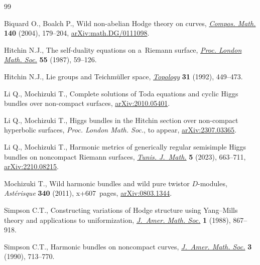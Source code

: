 \begin{thebibliography}{99}
\footnotesize\itemsep=0pt

Biquard O., Boalch P., Wild non-abelian {H}odge theory on curves,
 \href{https://doi.org/10.1112/S0010437X03000010}{\textit{Compos. Math.}} \textbf{140} (2004), 179--204,
 \href{https://arxiv.org/abs/math.DG/0111098}{arXiv:math.DG/0111098}.

Hitchin N.J., The self-duality equations on a~{R}iemann surface, \href{https://doi.org/10.1112/plms/s3-55.1.59}{\textit{Proc.
 London Math. Soc.}} \textbf{55} (1987), 59--126.

Hitchin N.J., Lie groups and {T}eichm\"uller space, \href{https://doi.org/10.1016/0040-9383(92)90044-I}{\textit{Topology}}
 \textbf{31} (1992), 449--473.

Li Q., Mochizuki T., Complete solutions of {T}oda equations and cyclic {H}iggs
 bundles over non-compact surfaces, \href{https://arxiv.org/abs/2010.05401}{arXiv:2010.05401}.

Li Q., Mochizuki T., Higgs bundles in the {H}itchin section over non-compact
 hyperbolic surfaces, \textit{Proc. London Math. Soc.}, {t}o appear,
 \href{https://arxiv.org/abs/2307.03365}{arXiv:2307.03365}.

Li Q., Mochizuki T., Harmonic metrics of generically regular semisimple {H}iggs
 bundles on noncompact {R}iemann surfaces, \href{https://doi.org/10.2140/tunis.2023.5.663}{\textit{Tunis. J.~Math.}} \textbf{5}
 (2023), 663--711, \href{https://arxiv.org/abs/2210.08215}{arXiv:2210.08215}.

Mochizuki T., Wild harmonic bundles and wild pure twistor {$D$}-modules,
 \textit{Ast\'erisque} \textbf{340} (2011), x+607~pages, \href{https://arxiv.org/abs/0803.1344}{arXiv:0803.1344}.

Simpson C.T., Constructing variations of {H}odge structure using
 {Y}ang--{M}ills theory and applications to uniformization, \href{https://doi.org/10.2307/1990994}{\textit{J.~Amer.
 Math. Soc.}} \textbf{1} (1988), 867--918.

Simpson C.T., Harmonic bundles on noncompact curves, \href{https://doi.org/10.2307/1990935}{\textit{J.~Amer. Math.
 Soc.}} \textbf{3} (1990), 713--770.

\end{thebibliography}

